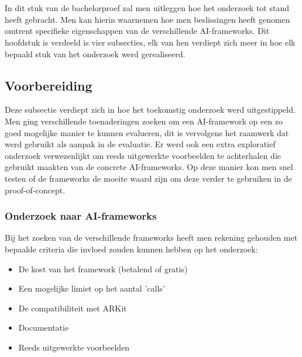 
\chapter{}
\label{ch:methodologie}


In dit stuk van de bachelorproef zal men uitleggen hoe het onderzoek tot stand heeft gebracht. Men kan hierin waarnemen hoe men beslissingen heeft genomen omtrent specifieke eigenschappen van de verschillende AI-frameworks. Dit hoofdstuk is verdeeld is vier subsecties, elk van hen verdiept zich meer in hoe elk bepaald stuk van het onderzoek werd gerealiseerd.

\section{Voorbereiding}
Deze subsectie verdiept zich in hoe het toekomstig onderzoek werd uitgestippeld. Men ging verschillende toenaderingen zoeken om een AI-framework op een zo goed mogelijke manier te kunnen evalueren, dit is vervolgens het raamwerk dat werd gebruikt als aanpak in de evaluatie. Er werd ook een extra exploratief onderzoek verwezenlijkt om reeds uitgewerkte voorbeelden te achterhalen die gebruikt maakten van de concrete AI-frameworks. Op deze manier kon men snel testen of de frameworks de moeite waard zijn om deze verder te gebruiken in de proof-of-concept.
\newpage

\subsection{ Onderzoek naar AI-frameworks}
Bij het zoeken van de verschillende frameworks heeft men rekening gehouden met bepaalde criteria die invloed zouden kunnen hebben op het onderzoek:
\begin{itemize}
	\item De kost van het framework (betalend of gratis)
	\item Een mogelijke limiet op het aantal 'calls'
	\item De compatibiliteit met ARKit
	\item Documentatie
	\item Reeds uitgewerkte voorbeelden
\end{itemize}

